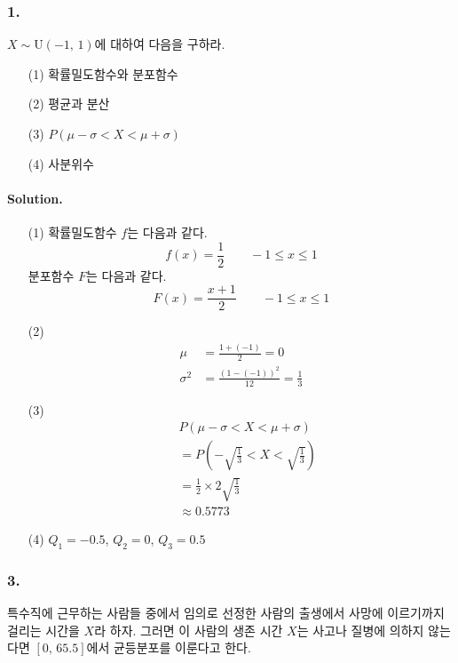 \subsubsection{1.} $X\sim\mathrm{U}\left(-1,\,1\right)$에 대하여 다음을 구하라.

\begin{itemize}
	\item [(1)] 확률밀도함수와 분포함수
	\item [(2)] 평균과 분산
	\item [(3)] $P\left(\mu - \sigma < X < \mu + \sigma\right)$
	\item [(4)] 사분위수
\end{itemize}

\paragraph{Solution.}

\begin{itemize}
	\item [(1)] {
		확률밀도함수 $f$는 다음과 같다.
		\[f\left(x\right) = \frac{1}{2} \qquad -1 \leq x \leq 1\]
		분포함수 $F$는 다음과 같다.
		\[F\left(x\right) = \frac{x+1}{2} \qquad -1 \leq x \leq 1\]
	}
	\item [(2)] {
		\begin{align*}
			\mu &= \frac{1 + \left(-1\right)}{2} = 0 \\
			\sigma^2 &= \frac{\left(1-\left(-1\right)\right)^2}{12} = \frac{1}{3}
		\end{align*}
	}
	\item [(3)] {
		\begin{align*}
			& P\left(\mu - \sigma < X < \mu + \sigma\right) \\\
			&= P\left(-\sqrt{\frac{1}{3}} < X < \sqrt{\frac{1}{3}}\right) \\
			&= \frac{1}{2} \times 2\sqrt{\frac{1}{3}} \\
			&\approx 0.5773
		\end{align*}
	}
	\item [(4)] $Q_1 = -0.5$, $Q_2 = 0$, $Q_3 = 0.5$
\end{itemize}

\subsubsection{3.} 특수직에 근무하는 사람들 중에서 임의로 선정한 사람의 출생에서 사망에 이르기까지 걸리는 시간을 $X$라 하자.
그러면 이 사람의 생존 시간 $X$는 사고나 질병에 의하지 않는다면 $\left[0,\,65.5\right]$에서 균등분포를 이룬다고 한다.

